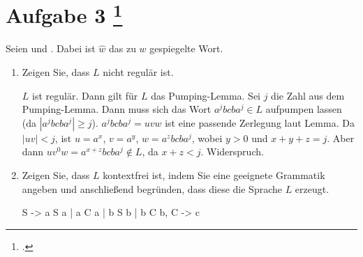 \documentclass{lehramt-informatik-aufgabe}
\begin{document}
\section{Aufgabe 3
\footcite{examen:66115:2020:09}}

Seien  und .
Dabei ist $\hat{w}$ das zu $w$ gespiegelte Wort.

\begin{enumerate}


\item Zeigen Sie, dass $L$ nicht regulär ist.

\begin{liExkurs}
\liPumpingRegulaer
\end{liExkurs}

\begin{liAntwort}
$L$ ist regulär.
Dann gilt für $L$ das Pumping-Lemma.
Sei $j$ die Zahl aus
dem Pumping-Lemma.
Dann muss sich das Wort $a^j b c b a^j \in L$
aufpumpen lassen (da $|a^j b c b a^j| \geq j$).
$a^j b c b a^j = uvw$ ist eine passende Zerlegung laut Lemma.
Da $|uv| < j$, ist
$u = a^x$, $v = a^y$, $w = a^z b c b a^j$, wobei
$y > 0$ und
$x + y + z = j$.
Aber dann
$u v^0 w= a^{x+z} b c b a^j \notin L$, da $x + z < j$.
Widerspruch.
\end{liAntwort}


\item Zeigen Sie, dass $L$ kontextfrei ist, indem Sie eine geeignete
Grammatik angeben und anschließend begründen, dass diese die Sprache $L$
erzeugt.

\begin{liAntwort}
\begin{liProduktionsRegeln}
S -> a S a | a C a | b S b | b C b,
C -> c
\end{liProduktionsRegeln}



\end{liAntwort}

\end{enumerate}
\end{document}
